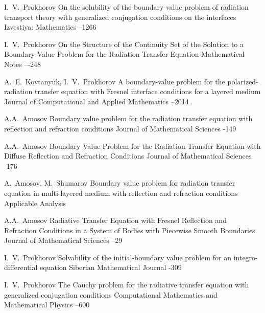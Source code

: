 \documentclass[12pt,reqno]{report}
\begin{document}
{\begin{thebibliography}{1}
 \by   I.~V.~Prokhorov \paper 
On the solubility of the boundary-value problem of radiation transport theory with generalized conjugation conditions on the interfaces
\jour Izvestiya: Mathematics
--1266
\

 \by I.~V.~Prokhorov \paper On the Structure of the Continuity Set of the Solution to a Boundary-Value Problem for the Radiation Transfer Equation \jour Mathematical Notes    –-248



 \by A.~E.~Kovtanyuk, I.~V.~Prokhorov \paper A
boundary-value problem for the polarized-radiation transfer
equation with Fresnel interface conditions for a layered medium
\jour Journal of Computational and Applied Mathematics 
  --2014


 \by A.A.~Amosov \paper Boundary value problem for the radiation transfer equation with
reflection and refraction conditions \jour Journal of Mathematical
Sciences     -149

 \by A.A.~Amosov \paper Boundary Value Problem for the Radiation Transfer Equation with
Diffuse Reflection and Refraction Conditions \jour Journal of
Mathematical Sciences     -176

 \by  A.~Amosov,  M.~Shumarov \paper
Boundary value problem for radiation transfer equation in multi-layered medium with reflection and refraction conditions
\jour Applicable Analysis     

  \by A.A.~Amosov \paper Radiative Transfer Equation with Fresnel Reflection and Refraction Conditions in a System of Bodies with Piecewise Smooth Boundaries
 \jour Journal of Mathematical Sciences  
--29





 \by I.~V.~Prokhorov  \paper Solvability of the initial-boundary value problem for an integro-differential equation
\jour Siberian Mathematical Journal   
-309


 \by \by I.~V.~Prokhorov  \paper  The Cauchy problem for the radiative transfer equation with generalized conjugation conditions \jour Computational Mathematics and Mathematical Physics  
 --600


\end{thebibliography}}
\end{document}

